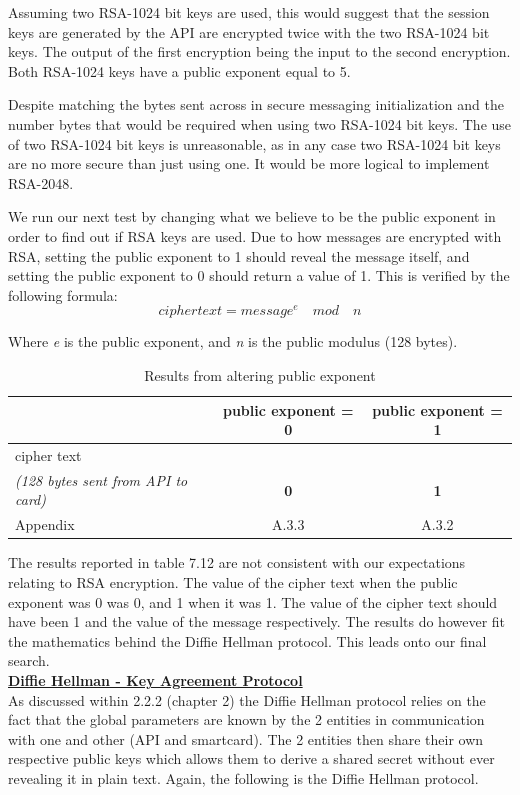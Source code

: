\documentclass[bsc,frontabs,twoside,singlespacing,parskip,deptreport]{infthesis}     %
\begin{document}
Assuming two RSA-1024 bit keys are used, this would suggest that the session keys are generated by the API are encrypted twice with the two RSA-1024 bit keys. The output of the first encryption being the input to the second encryption. Both RSA-1024 keys have a public exponent equal to 5. 

Despite matching the bytes sent across in secure messaging initialization and the number bytes that would be required when using two RSA-1024 bit keys. The use of two RSA-1024 bit keys is unreasonable, as in any case two RSA-1024 bit keys are no more secure than just using one. It would be more logical to implement RSA-2048.


We run our next test by changing what we believe to be the public exponent in order to find out if RSA keys are used. Due to how messages are encrypted with RSA, setting the public exponent to 1 should reveal the message itself, and setting the public exponent to 0 should return a value of 1. This is verified by the following formula:\\

$$ ciphertext = message^{e} \quad mod \quad n $$

Where \textit{e} is the public exponent, and \textit{n} is the public modulus (128 bytes).\\


\begin{table}[H]
\begin{tabular}{|l|c|c|}
\hline
& public exponent = 0 & public exponent = 1\\
\hline
cipher text & &\\
\textit{(128 bytes sent from API to card)} & \textbf{0} & \textbf{1} \\

\hline
Appendix & A.3.3 & A.3.2 \\
\hline
\end{tabular}
\caption{Results from altering public exponent}
\end{table}

The results reported in table 7.12 are not consistent with our expectations relating to RSA encryption. The value of the cipher text when the public exponent was 0 was 0, and 1 when it was 1. The value of the cipher text should have been 1 and the value of the message respectively. The results do however fit the mathematics behind the Diffie Hellman protocol. This leads onto our final search.\\

\underline{\textbf{Diffie Hellman - Key Agreement Protocol}}\\
As discussed within 2.2.2 (chapter 2) the Diffie Hellman protocol relies on the fact that the global parameters are known by the 2 entities in communication with one and other (API and smartcard). The 2 entities then share their own respective public keys which allows them to derive a shared secret without ever revealing it in plain text. Again, the following is the Diffie Hellman protocol.\\
\end{document}
